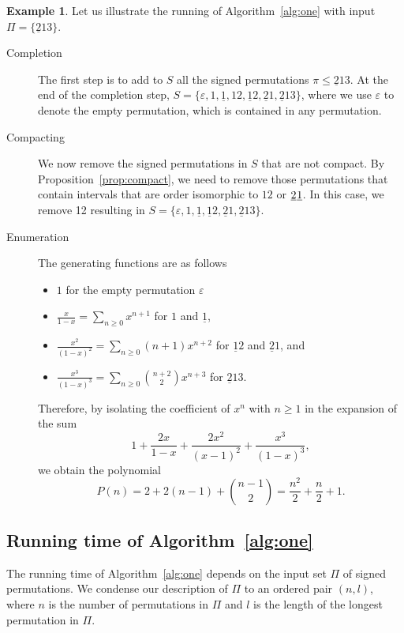 \documentclass{article}
\numberwithin{equation}{section}
\theoremstyle{definition}
\newtheorem{example}[defn]{Example}
\begin{document}
\begin{example}
Let us illustrate the running of Algorithm~\ref{alg:one} with input $\Pi=\{\underline{2}13\}$. 
\begin{description}
\item[Completion] The first step is to add to $S$ all the signed permutations $\pi\leq \underline{2}13$. At the end of the completion step,  $S=\{\varepsilon,1,\underline{1},12,\underline{1}2,\underline{2}1, \underline{2}13\}$, where we use $\varepsilon$ to denote the empty permutation, which is contained in any permutation.
\item[Compacting] We now remove the signed permutations in $S$ that are not compact. By Proposition~\ref{prop:compact}, we need to remove those permutations that contain intervals that are order isomorphic to $12$ or $\underline{2}\hspace{0.02cm}\underline{1}$. In this case, we remove 12 resulting in $S=\{\varepsilon,1,\underline{1},\underline{1}2,\underline{2}1, \underline{2}13\}$.
\item[Enumeration] The generating functions are as follows
\begin{itemize}
    \item $1$ for the empty permutation $\varepsilon$
    \item $\frac{x}{1-x}=\sum_{n\geq0}x^{n+1}$ for $1$ and $\underline{1}$,
    \item $\frac{x^2}{(1-x)^2}=\sum_{n\geq0}(n+1)x^{n+2}$ for $\underline{1}2$ and $\underline{2}1$, and
    \item $\frac{x^3}{(1-x)^3}=\sum_{n\geq0}\binom{n+2}{2}x^{n+3}$ for $\underline{2}13$.
\end{itemize} Therefore, by isolating the coefficient of $x^n$ with $n\geq1$ in the expansion of the sum 
\[
1+\frac{2x}{1-x}+\frac{2x^2}{(x-1)^2}+\frac{x^3}{(1-x)^3},
\]
we obtain the polynomial
\[
P(n)=2+2(n-1)+\binom{n-1}{2}=\frac{n^2}{2}+\frac{n}{2}+1.
\] 
\end{description}
\end{example} 

\subsection{Running time of Algorithm~\ref{alg:one}}
The running time of Algorithm~\ref{alg:one} depends on the input set $\Pi$ of signed permutations.  We condense our description of $\Pi$ to an ordered pair $(n,l)$, where $n$ is the number of permutations in $\Pi$ and $l$ is the length of the longest permutation in $\Pi$.
\end{document}
